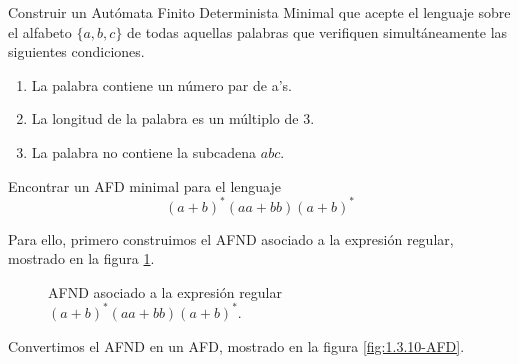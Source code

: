 \begin{ejercicio}\label{ej:1.3.9}
    Construir un Autómata Finito Determinista Minimal que acepte el lenguaje sobre el alfabeto $\{a,b,c\}$ de todas aquellas palabras que verifiquen simultáneamente las siguientes condiciones.
    \begin{enumerate}
        \item La palabra contiene un número par de a's.
        \item La longitud de la palabra es un múltiplo de 3.
        \item La palabra no contiene la subcadena $abc$.
    \end{enumerate}
\end{ejercicio}

\begin{ejercicio}\label{ej:1.3.10}
    Encontrar un AFD minimal para el lenguaje
    \begin{equation*}
        {(a+b)}^{\ast}(aa+bb){(a+b)}^{\ast}
    \end{equation*}

    Para ello, primero construimos el AFND asociado a la expresión regular, mostrado en la figura \ref{fig:1.3.10-AFND}.
    \begin{figure}[H]
        \centering
        \caption{AFND asociado a la expresión regular ${(a+b)}^{\ast}(aa+bb){(a+b)}^{\ast}$.}
        \label{fig:1.3.10-AFND}
    \end{figure}

    Convertimos el AFND en un AFD, mostrado en la figura \ref{fig:1.3.10-AFD}.
    \begin{figure}[H]
        \centering
\end{figure}
\end{ejercicio}
